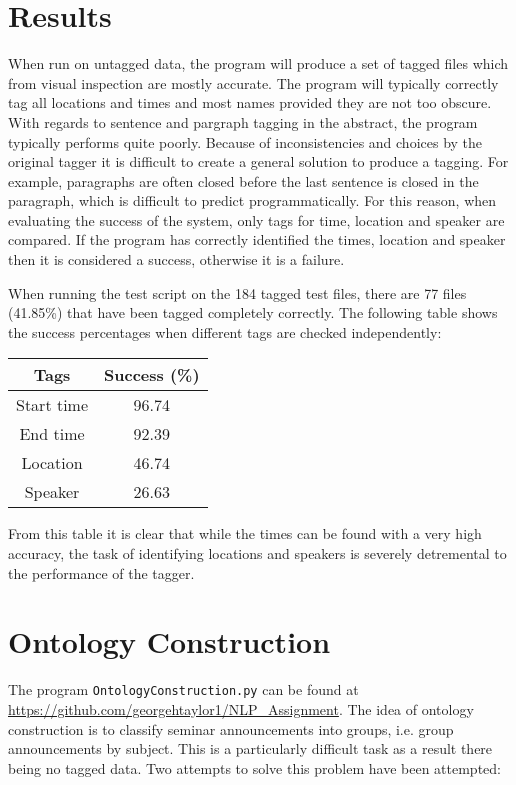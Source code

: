 \documentclass[draft]{article}
\begin{document}
\begin{multicols*}{2}
\section*{Results}
When run on untagged data, the program will produce a set of tagged files which from visual inspection are mostly accurate. The program will typically correctly tag all locations and times and most names provided they are not too obscure. With regards to sentence and pargraph tagging in the abstract, the program typically performs quite poorly. Because of inconsistencies and choices by the original tagger it is difficult to create a general solution to produce a tagging. For example, paragraphs are often closed before the last sentence is closed in the paragraph, which is difficult to predict programmatically. For this reason, when evaluating the success of the system, only tags for time, location and speaker are compared. If the program has correctly identified the times, location and speaker then it is considered a success, otherwise it is a failure.

When running the test script on the 184 tagged test files, there are 77 files (41.85\%) that have been tagged completely correctly. The following table shows the success percentages when different tags are checked independently:
\begin{center}
\begin{tabular}{| c || c |}
\hline
Tags & Success (\%) \\
\hline
Start time & 96.74 \\
End time   & 92.39 \\
Location   & 46.74 \\
Speaker    & 26.63 \\
\hline
\end{tabular}
\end{center}  

From this table it is clear that while the times can be found with a very high accuracy, the task of identifying locations and speakers is severely detremental to the performance of the tagger.

\section*{Ontology Construction}
The program \texttt{OntologyConstruction.py} can be found at \href{https://github.com/georgehtaylor1/NLP_Assignment}{https://github.com/georgehtaylor1/NLP\_Assignment}. The idea of ontology construction is to classify seminar announcements into groups, i.e. group announcements by subject. This is a particularly difficult task as a result there being no tagged data. Two attempts to solve this problem have been attempted:


\end{multicols*}
\end{document}

